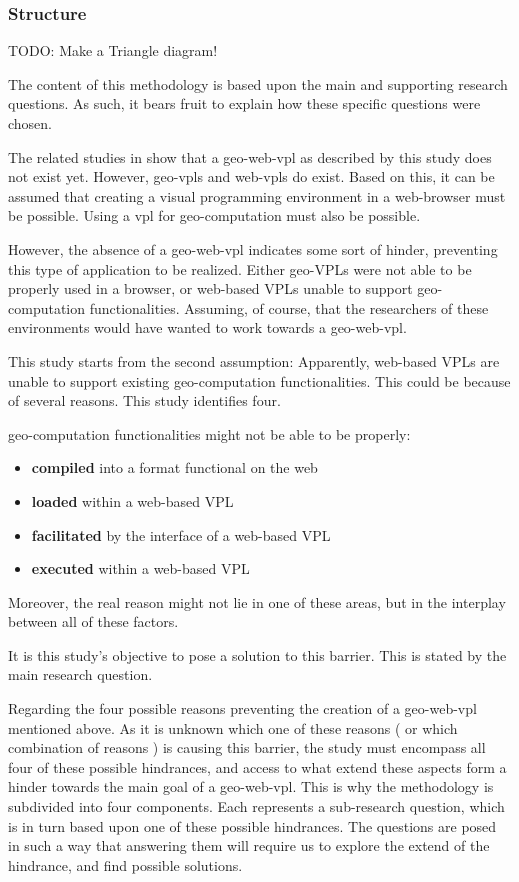 \subsubsection*{Structure}

\begin{note}
TODO: Make a Triangle diagram!
\end{note}
  

The content of this methodology is based upon the main and supporting research questions. 
As such, it bears fruit to explain how these specific questions were chosen. 

The related studies in  show that a \ac{geo-web-vpl} as described by this study does not exist yet. However, geo-vpls and web-vpls do exist. 
Based on this, it can be assumed that creating a visual programming environment in a web-browser must be possible. 
Using a \ac*{vpl} for geo-computation must also be possible. 

However, the absence of a geo-web-vpl indicates some sort of hinder, preventing this type of application to be realized. Either geo-VPLs were not able to be properly used in a browser, or web-based VPLs unable to support geo-computation functionalities. 
Assuming, of course, that the researchers of these environments would have wanted to work towards a \ac{geo-web-vpl}.

This study starts from the second assumption: 
Apparently, web-based VPLs are unable to support existing geo-computation functionalities. 
This could be because of several reasons. 
This study identifies four.

geo-computation functionalities might not be able to be properly:
\begin{itemize}[-]
  \item \textbf{compiled} into a format functional on the web
  \item \textbf{loaded} within a web-based VPL
  \item \textbf{facilitated} by the interface of a web-based VPL
  \item \textbf{executed} within a web-based VPL
\end{itemize}
Moreover, the real reason might not lie in one of these areas, but in the interplay between all of these factors. 

It is this study's objective to pose a solution to this barrier. This is stated by the main research question. 

Regarding the four possible reasons preventing the creation of a geo-web-vpl 
mentioned above. 
As it is unknown which one of these reasons ( or which combination of reasons ) is causing this barrier, the study must encompass all four of these possible hindrances, and access to what extend these aspects form a hinder towards the main goal of a \ac{geo-web-vpl}. 
This is why the methodology is subdivided into four components.
Each represents a sub-research question, which is in turn based upon one of these possible hindrances. The questions are posed in such a way that answering them will require us to explore the extend of the hindrance, and find possible solutions.

